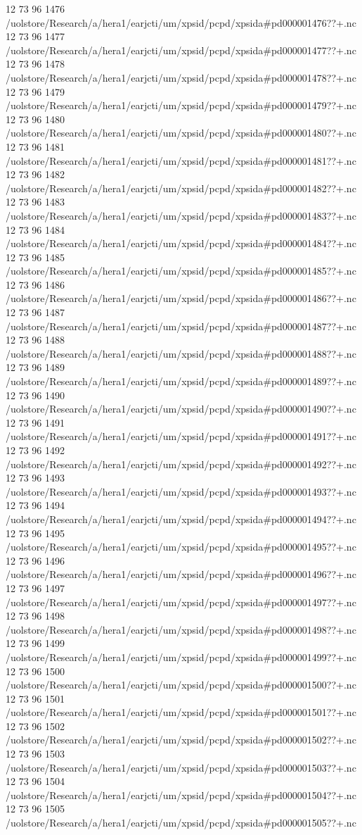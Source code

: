 12 73 96
1476
/uolstore/Research/a/hera1/earjcti/um/xpsid/pcpd/xpsida#pd000001476??+.nc
12 73 96
1477
/uolstore/Research/a/hera1/earjcti/um/xpsid/pcpd/xpsida#pd000001477??+.nc
12 73 96
1478
/uolstore/Research/a/hera1/earjcti/um/xpsid/pcpd/xpsida#pd000001478??+.nc
12 73 96
1479
/uolstore/Research/a/hera1/earjcti/um/xpsid/pcpd/xpsida#pd000001479??+.nc
12 73 96
1480
/uolstore/Research/a/hera1/earjcti/um/xpsid/pcpd/xpsida#pd000001480??+.nc
12 73 96
1481
/uolstore/Research/a/hera1/earjcti/um/xpsid/pcpd/xpsida#pd000001481??+.nc
12 73 96
1482
/uolstore/Research/a/hera1/earjcti/um/xpsid/pcpd/xpsida#pd000001482??+.nc
12 73 96
1483
/uolstore/Research/a/hera1/earjcti/um/xpsid/pcpd/xpsida#pd000001483??+.nc
12 73 96
1484
/uolstore/Research/a/hera1/earjcti/um/xpsid/pcpd/xpsida#pd000001484??+.nc
12 73 96
1485
/uolstore/Research/a/hera1/earjcti/um/xpsid/pcpd/xpsida#pd000001485??+.nc
12 73 96
1486
/uolstore/Research/a/hera1/earjcti/um/xpsid/pcpd/xpsida#pd000001486??+.nc
12 73 96
1487
/uolstore/Research/a/hera1/earjcti/um/xpsid/pcpd/xpsida#pd000001487??+.nc
12 73 96
1488
/uolstore/Research/a/hera1/earjcti/um/xpsid/pcpd/xpsida#pd000001488??+.nc
12 73 96
1489
/uolstore/Research/a/hera1/earjcti/um/xpsid/pcpd/xpsida#pd000001489??+.nc
12 73 96
1490
/uolstore/Research/a/hera1/earjcti/um/xpsid/pcpd/xpsida#pd000001490??+.nc
12 73 96
1491
/uolstore/Research/a/hera1/earjcti/um/xpsid/pcpd/xpsida#pd000001491??+.nc
12 73 96
1492
/uolstore/Research/a/hera1/earjcti/um/xpsid/pcpd/xpsida#pd000001492??+.nc
12 73 96
1493
/uolstore/Research/a/hera1/earjcti/um/xpsid/pcpd/xpsida#pd000001493??+.nc
12 73 96
1494
/uolstore/Research/a/hera1/earjcti/um/xpsid/pcpd/xpsida#pd000001494??+.nc
12 73 96
1495
/uolstore/Research/a/hera1/earjcti/um/xpsid/pcpd/xpsida#pd000001495??+.nc
12 73 96
1496
/uolstore/Research/a/hera1/earjcti/um/xpsid/pcpd/xpsida#pd000001496??+.nc
12 73 96
1497
/uolstore/Research/a/hera1/earjcti/um/xpsid/pcpd/xpsida#pd000001497??+.nc
12 73 96
1498
/uolstore/Research/a/hera1/earjcti/um/xpsid/pcpd/xpsida#pd000001498??+.nc
12 73 96
1499
/uolstore/Research/a/hera1/earjcti/um/xpsid/pcpd/xpsida#pd000001499??+.nc
12 73 96
1500
/uolstore/Research/a/hera1/earjcti/um/xpsid/pcpd/xpsida#pd000001500??+.nc
12 73 96
1501
/uolstore/Research/a/hera1/earjcti/um/xpsid/pcpd/xpsida#pd000001501??+.nc
12 73 96
1502
/uolstore/Research/a/hera1/earjcti/um/xpsid/pcpd/xpsida#pd000001502??+.nc
12 73 96
1503
/uolstore/Research/a/hera1/earjcti/um/xpsid/pcpd/xpsida#pd000001503??+.nc
12 73 96
1504
/uolstore/Research/a/hera1/earjcti/um/xpsid/pcpd/xpsida#pd000001504??+.nc
12 73 96
1505
/uolstore/Research/a/hera1/earjcti/um/xpsid/pcpd/xpsida#pd000001505??+.nc
